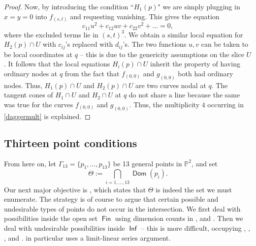 \documentclass[reqno, 11pt]{amsart}
\theoremstyle{plain}
\newtheorem{lemma}[theorem]{Lemma}
\theoremstyle{remark}
\renewcommand{\P}{\mathbb{P}}
\DeclareMathOperator{\Dom}{\mathsf{Dom}}
\DeclareMathOperator{\Inf}{\mathsf{Inf}}
\DeclareMathOperator{\Fin}{\mathsf{Fin}}
\DeclareMathOperator{\Inc}{\mathsf{Inc}}
\DeclareMathOperator{\Base}{\mathsf{Base}}
\begin{document}
\begin{proof}
    Now, by introducing the condition ``$H_{1}(p)$" we are simply plugging in $x=y=0$ into $f_{(s,t)}$ and requesting vanishing. This gives the equation $$c_{11}u^2 + c_{12}uv + c_{22}v^2 + \dots = 0,$$ where the excluded terms lie in $(s,t)^{3}$. We obtain a similar local equation for $H_{2}(p) \cap U$ with $c_{ij}$'s replaced with $d_{ij}$'s.  The two functions $u,v$ can be taken to be local coordinates at $q$ -- this is due to the genericity assumptions on the slice $U$. It follows that the local equations $H_{i}(p) \cap U$ inherit the property of having ordinary nodes at $q$ from the fact that $f_{(0,0)}$ and $g_{(0,0)}$ both had ordinary nodes. Thus, $H_{1}(p) \cap U$ and $H_{2}(p)\cap U$ are two curves nodal at $q$.  The tangent cones of $H_{1}\cap U$ and $H_{2} \cap U$ at $q$ do not share a line because the same was true for the curves $f_{(0,0)}$ and $g_{(0,0)}$.  Thus,  the multiplicity $4$ occurring in \eqref{daggermult} is explained.  
\end{proof}









\subsection{Thirteen point conditions}
\label{sec:thirteenpointconditions}

From here on, let $\Gamma_{13} = \{p_{1}, \dots, p_{13}\}$ be 13 general points in
$\P^{2}$, and set \begin{equation}
\label{equation:Theta}\Theta := \bigcap \limits_{i=1, \dots, 13} \Dom(p_i).
\end{equation}
Our next major objective is , which states that $\Theta$ is indeed the set we must enumerate. The strategy is of course to argue that certain possible and undesirable types of points do not occur in the intersection.  We first deal with possibilities inside the open set $\Fin$ using dimension counts in  , and . Then we deal with undesirable possibilities inside $\Inf$ -- this is more difficult, occupying , ,  , and .   in particular uses a limit-linear series argument.
\end{document}
